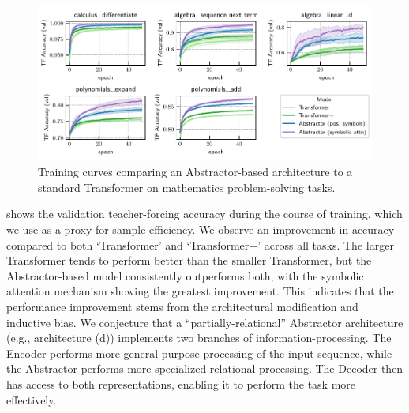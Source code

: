 \begin{figure}[t]
    \centering
    \includegraphics[width=\textwidth]{figures/experiments/math_training_curves.pdf}
    \vskip-10pt
    \caption{Training curves comparing an Abstractor-based architecture to a standard Transformer on mathematics problem-solving tasks.}\label{fig:math_training_curves}
    \vskip -15pt
\end{figure}

 shows the validation teacher-forcing accuracy during the course of training, which we use as a proxy for sample-efficiency. We observe an improvement in accuracy compared to both `Transformer' and `Transformer+' across all tasks. The larger Transformer tends to perform better than the smaller Transformer, but the Abstractor-based model consistently outperforms both, with the symbolic attention mechanism showing the greatest improvement. This indicates that the performance improvement stems from the architectural modification and inductive bias. We conjecture that a ``partially-relational'' Abstractor architecture (e.g., architecture (d)) implements two branches of information-processing. The Encoder performs more general-purpose processing of the input sequence, while the Abstractor performs more specialized relational processing. The Decoder then has access to both representations, enabling it to perform the task more effectively.
